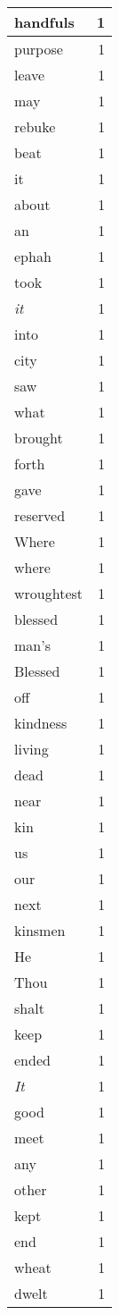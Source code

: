 \begin{center}
\begin{longtable}{l|r}
handfuls & 1 \\ \hline
purpose & 1 \\ \hline
leave & 1 \\ \hline
may & 1 \\ \hline
rebuke & 1 \\ \hline
beat & 1 \\ \hline
it & 1 \\ \hline
about & 1 \\ \hline
an & 1 \\ \hline
ephah & 1 \\ \hline
took & 1 \\ \hline
\emph{it} & 1 \\ \hline
into & 1 \\ \hline
city & 1 \\ \hline
saw & 1 \\ \hline
what & 1 \\ \hline
brought & 1 \\ \hline
forth & 1 \\ \hline
gave & 1 \\ \hline
reserved & 1 \\ \hline
Where & 1 \\ \hline
where & 1 \\ \hline
wroughtest & 1 \\ \hline
blessed & 1 \\ \hline
man's & 1 \\ \hline
Blessed & 1 \\ \hline
off & 1 \\ \hline
kindness & 1 \\ \hline
living & 1 \\ \hline
dead & 1 \\ \hline
near & 1 \\ \hline
kin & 1 \\ \hline
us & 1 \\ \hline
our & 1 \\ \hline
next & 1 \\ \hline
kinsmen & 1 \\ \hline
He & 1 \\ \hline
Thou & 1 \\ \hline
shalt & 1 \\ \hline
keep & 1 \\ \hline
ended & 1 \\ \hline
\emph{It} & 1 \\ \hline
good & 1 \\ \hline
meet & 1 \\ \hline
any & 1 \\ \hline
other & 1 \\ \hline
kept & 1 \\ \hline
end & 1 \\ \hline
wheat & 1 \\ \hline
dwelt & 1 \\ \hline
\end{longtable}
\end{center}



